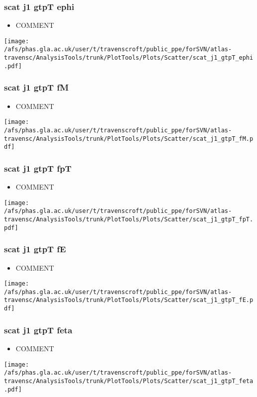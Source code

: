\documentclass{beamer}
\begin{document}
\begin{frame}
\frametitle{scat j1 gtpT ephi}
\begin{itemize}
\item COMMENT
\end{itemize}
\begin{center}
\texttt{[image: /afs/phas.gla.ac.uk/user/t/travenscroft/public\_ppe/forSVN/atlas-travensc/AnalysisTools/trunk/PlotTools/Plots/Scatter/scat\_j1\_gtpT\_ephi.pdf]}
\end{center}
\end{frame}

\begin{frame}
\frametitle{scat j1 gtpT fM}
\begin{itemize}
\item COMMENT
\end{itemize}
\begin{center}
\texttt{[image: /afs/phas.gla.ac.uk/user/t/travenscroft/public\_ppe/forSVN/atlas-travensc/AnalysisTools/trunk/PlotTools/Plots/Scatter/scat\_j1\_gtpT\_fM.pdf]}
\end{center}
\end{frame}

\begin{frame}
\frametitle{scat j1 gtpT fpT}
\begin{itemize}
\item COMMENT
\end{itemize}
\begin{center}
\texttt{[image: /afs/phas.gla.ac.uk/user/t/travenscroft/public\_ppe/forSVN/atlas-travensc/AnalysisTools/trunk/PlotTools/Plots/Scatter/scat\_j1\_gtpT\_fpT.pdf]}
\end{center}
\end{frame}

\begin{frame}
\frametitle{scat j1 gtpT fE}
\begin{itemize}
\item COMMENT
\end{itemize}
\begin{center}
\texttt{[image: /afs/phas.gla.ac.uk/user/t/travenscroft/public\_ppe/forSVN/atlas-travensc/AnalysisTools/trunk/PlotTools/Plots/Scatter/scat\_j1\_gtpT\_fE.pdf]}
\end{center}
\end{frame}

\begin{frame}
\frametitle{scat j1 gtpT feta}
\begin{itemize}
\item COMMENT
\end{itemize}
\begin{center}
\texttt{[image: /afs/phas.gla.ac.uk/user/t/travenscroft/public\_ppe/forSVN/atlas-travensc/AnalysisTools/trunk/PlotTools/Plots/Scatter/scat\_j1\_gtpT\_feta.pdf]}
\end{center}
\end{frame}
\end{document}
